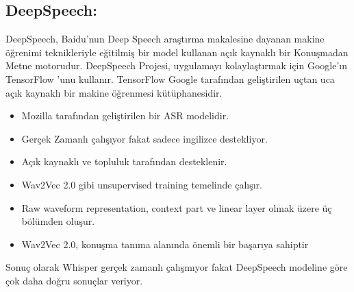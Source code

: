 \documentclass{article}
\begin{document}
	\subsection{DeepSpeech:}
		DeepSpeech, Baidu'nun Deep Speech araştırma makalesine \cite{DBLP:journals/corr/HannunCCCDEPSSCN14} dayanan makine öğrenimi teknikleriyle eğitilmiş bir model kullanan açık kaynaklı bir Konuşmadan Metne motorudur. DeepSpeech Projesi, uygulamayı kolaylaştırmak için Google'ın TensorFlow 'unu kullanır. TensorFlow Google tarafından geliştirilen uçtan uca açık kaynaklı bir makine öğrenmesi kütüphanesidir.
	\begin{itemize}
		\item Mozilla tarafından geliştirilen bir ASR modelidir.
		\item Gerçek Zamanlı çalışıyor fakat sadece ingilizce destekliyor.
		\item Açık kaynaklı ve topluluk tarafından desteklenir. 
		\item Wav2Vec 2.0 gibi unsupervised training temelinde çalışır.
		\item Raw waveform representation, context part ve linear layer olmak üzere üç bölümden oluşur.
		\item Wav2Vec 2.0, konuşma tanıma alanında önemli bir başarıya sahiptir \\
	\end{itemize}
	Sonuç olarak Whisper gerçek zamanlı çalışmıyor fakat DeepSpeech modeline göre çok daha doğru sonuçlar veriyor.
	
	
\end{document}
